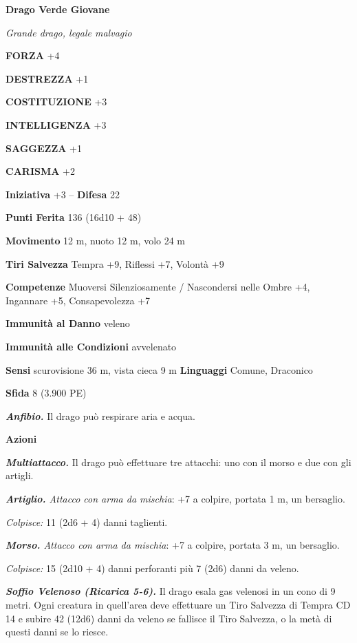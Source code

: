 \begin{multicols}{2}
\medskip{}\textbf{Drago Verde Giovane}

\emph{Grande drago, legale malvagio}

\textbf{FORZA} +4

\textbf{DESTREZZA} +1

\textbf{COSTITUZIONE} +3

\textbf{INTELLIGENZA} +3

\textbf{SAGGEZZA} +1

\textbf{CARISMA} +2

\textbf{Iniziativa} +3 -- \textbf{Difesa} 22

\textbf{Punti Ferita} 136 (16d10 + 48)

\textbf{Movimento} 12 m, nuoto 12 m, volo 24 m

\textbf{Tiri Salvezza} Tempra +9, Riflessi +7, Volontà +9

\textbf{Competenze} Muoversi Silenziosamente / Nascondersi nelle Ombre +4, Ingannare +5, Consapevolezza +7

\textbf{Immunità al Danno} veleno

\textbf{Immunità alle Condizioni} avvelenato

\textbf{Sensi} scurovisione 36 m, vista cieca 9 m
\textbf{Linguaggi} Comune, Draconico

\textbf{Sfida} 8 (3.900 PE)

\emph{\textbf{Anfibio.}} Il drago può respirare aria e acqua.

\textbf{Azioni}

\emph{\textbf{Multiattacco.}} Il drago può effettuare tre attacchi: uno con il morso e due con gli artigli. 

\emph{\textbf{Artiglio.} Attacco con arma da mischia}: +7 a colpire, portata 1 m, un bersaglio.

\emph{Colpisce:} 11 (2d6 + 4) danni taglienti.

\emph{\textbf{Morso.} Attacco con arma da mischia}: +7 a colpire, portata 3 m, un bersaglio.

\emph{Colpisce:} 15 (2d10 + 4) danni perforanti più 7 (2d6) danni da veleno.

\emph{\textbf{Soffio Velenoso (Ricarica 5-6).}} Il drago esala gas velenosi in un cono di 9 metri. Ogni creatura in quell'area deve effettuare un Tiro Salvezza di Tempra CD 14 e subire 42 (12d6) danni da veleno se fallisce il Tiro Salvezza, o la metà di questi danni se lo riesce.


\end{multicols}
